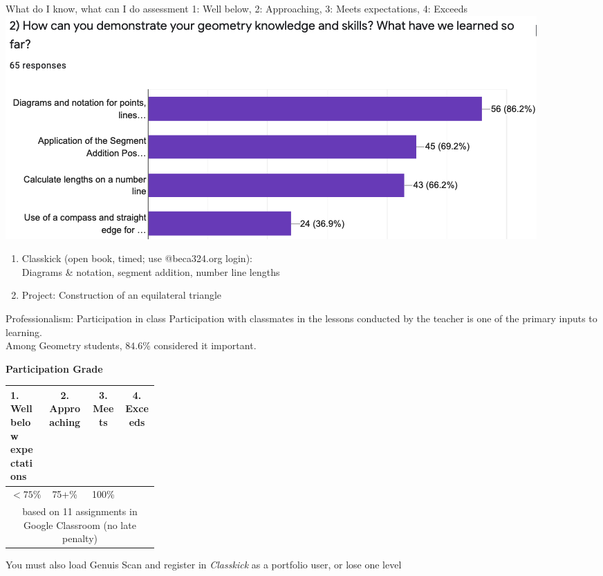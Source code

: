 \begin{frame}{What do I know, what can I do assessment}
  {1: Well below, 2: Approaching, 3: Meets expectations, 4: Exceeds}
  \includegraphics[width=.95\textwidth]{../graphics/know+do-bar-chart.png}
    \begin{enumerate}
      \item Classkick (open book, timed; use @beca324.org login):\\ Diagrams \& notation, segment addition, number line lengths
      \item Project: Construction of an equilateral triangle
    \end{enumerate}
  \end{frame}

\begin{frame}{Professionalism: Participation in class}
  Participation with classmates in the lessons conducted by the teacher is one of the primary inputs to learning.\\[0.25cm]
  Among Geometry students, $84.6\%$ considered it important. \vspace{0.5cm}
    \begin{table}[ht]
      \textbf{Participation Grade}
      \begin{tabular}[t]{p{0.25\linewidth} c c c }%
        \hline
        1. Well below \newline expectations & 2. Approaching & 3. Meets & 4. Exceeds \\
        \hline
        \hspace{0.5cm}$<75\%$ & 75+\% & 100\% &  \\[0.25cm]
        \multicolumn{4}{c}{based on 11 assignments in Google Classroom (no late penalty)} \\[0.25cm]
        \hline
      \end{tabular}
  \end{table} \vspace{0.25cm}
  You must also load Genuis Scan and register in \emph{Classkick} as a portfolio user, or lose one level
  \vspace{1cm}
\end{frame}

  